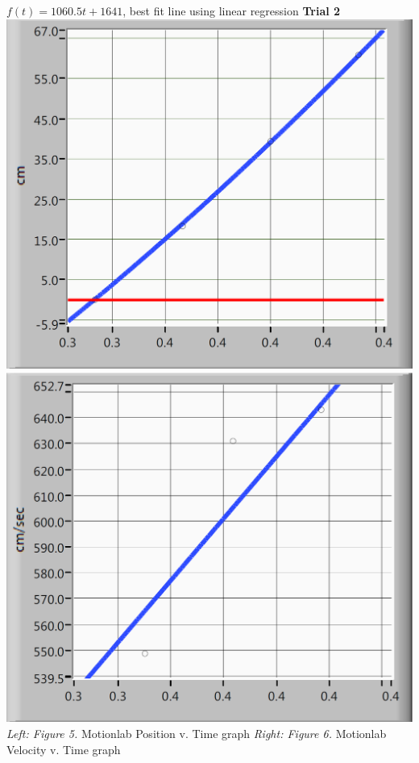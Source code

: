 \documentclass[12pt,letterpaper]{article}
\begin{document}
\(f(t) = 1060.5t + 1641\), best fit line using linear regression
\newline\newline
\textbf{Trial 2}
\newline\newline
\includegraphics[scale=0.47]{r2p.png}
\includegraphics[scale=0.47]{r2v.png}
\newline
\textit{Left: Figure 5.} Motionlab Position v. Time graph \textit{Right: Figure 6.} Motionlab Velocity v. Time graph
\end{document}

